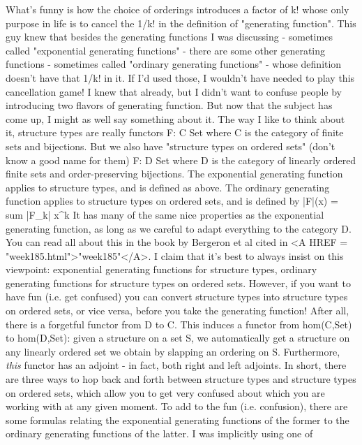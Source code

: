 What's funny is how the choice of orderings introduces a factor of k! 
whose only purpose in life is to cancel the 1/k! in the definition of 
"generating function".  
This guy knew that besides the generating functions I was discussing - 
sometimes called "exponential generating functions" - there are some 
other generating functions - sometimes called "ordinary generating 
functions" - whose definition doesn't have that 1/k! in it.   If I'd 
used those, I wouldn't have needed to play this cancellation game!
I knew that already, but I didn't want to confuse people by
introducing two flavors of generating function. 
But now that the subject has come up, I might as well say
something about it. 
The way I like to think about it, structure types are really
functors
F: C \to  Set
where C is the category of finite sets and bijections.  But we
also have "structure types on ordered sets" (don't know a good name for them) 
F: D \to  Set
where D is the category of linearly ordered finite sets and 
order-preserving bijections.  The exponential generating function
applies to structure types, and is defined as above.  The ordinary 
generating function applies to structure types on ordered sets,
and is defined by
|F|(x) = sum  |F_{k}|  x^{k}
It has many of the same nice properties as the exponential
generating function, as long as we careful to adapt everything
to the category D.   You can read all about this in the book
by Bergeron et al cited in <A HREF = "week185.html">"week185"</A>.
I claim that it's best to always insist on this viewpoint:
exponential generating functions for structure types, 
ordinary generating functions for structure types on ordered sets.
However, if you want to have fun (i.e. get confused) you can
convert structure types into structure types on ordered sets,
or vice versa, before you take the generating function!
After all, there is a forgetful functor from D to C.   This induces
a functor from hom(C,Set) to hom(D,Set): given a structure on a
set S, we automatically get a structure on any linearly ordered set 
we obtain by slapping an ordering on S.   Furthermore, \emph{this} functor 
has an adjoint - in fact, both right and left adjoints.  
In short, there are three ways to hop back and forth between structure 
types and structure types on ordered sets, which allow you to get
very confused about which you are working with at any given moment. 
To add to the fun (i.e. confusion), there are some formulas relating 
the exponential generating functions of the former to the ordinary 
generating functions of the latter.  I was implicitly using one of 
